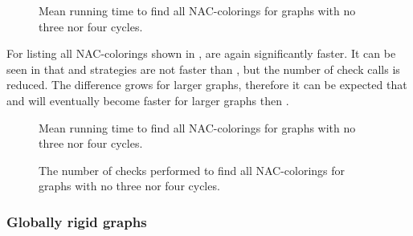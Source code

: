 \begin{figure}[thbp]
	\centering
	\scalebox{\BenchFigureScale}{}
	\caption[Mean runtime for graphs with no 3 nor 4 cycles (some).]{
		Mean running time to find all NAC-colorings for graphs with no three nor four cycles.}%
	\label{fig:graph_count_no_3_nor_4_cycles_first_runtime}
\end{figure}%

For listing all NAC-colorings shown in ,
\Subgraphs{} are again significantly faster.
It can be seen in 
that \Neighbors{} and \CyclesMatchChunks{} strategies are not faster than \None{},
but the number of \IsNACColoring{} check calls is reduced.
The difference grows for larger graphs, therefore it can be expected
that \Neighbors{} and \CyclesMatchChunks{} will eventually become faster
for larger graphs then \None{}.
%
%
\begin{figure}[thbp]
	\centering
	\scalebox{\BenchFigureScale}{}
	\caption[Mean runtime for graphs with no 3 nor 4 cycles (all).]{
		Mean running time to find all NAC-colorings for graphs with no three nor four cycles.}%
	\label{fig:graph_count_no_3_nor_4_cycles_all_runtime}
\end{figure}%
\begin{figure}[thbp]
	\centering
	\scalebox{\BenchFigureScale}{}
	\caption[Checks performed for graphs with no 3 nor 4 cycles (all).]{
		The number of checks performed to find all NAC-colorings for graphs with no three nor four cycles.}%
	\label{fig:graph_count_no_3_nor_4_cycles_all_checks}
\end{figure}%


\subsubsection*{Globally rigid graphs}

